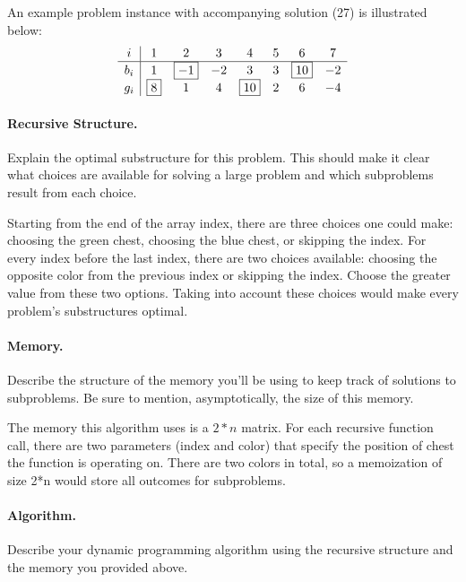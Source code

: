     An example problem instance with accompanying solution (27) is illustrated below:
    \[ 
        \begin{array}{c|ccccccc}
            i   & 1 & 2 & 3 & 4 & 5 & 6 & 7 \\ \hline
            b_i & 1 & \fbox{$-1$} & -2 & 3 & 3 & \fbox{10} & -2 \\
            g_i & \fbox{8} & 1 & 4 & \fbox{10} & 2 & 6 & -4
        \end{array}
    \]


\paragraph{Recursive Structure.}
Explain the optimal substructure for this problem. This should make it clear what choices are available for solving a large problem and which subproblems result from each choice.

Starting from the end of the array index, there are three choices one could make: choosing the green chest, choosing the blue chest, or skipping the index. For every index before the last index, there are two choices available: choosing the opposite color from the previous index or skipping the index. Choose the greater value from these two options. Taking into account these choices would make every problem's substructures optimal. 


\paragraph{Memory.}
Describe the structure of the memory you'll be using to keep track of solutions to subproblems. Be sure to mention, asymptotically, the size of this memory.

The memory this algorithm uses is a $2*n$ matrix. For each recursive function call, there are two parameters (index and color) that specify the position of chest the function is operating on. There are two colors in total, so a memoization of size 2*n would store all outcomes for subproblems.

\paragraph{Algorithm.}
Describe your dynamic programming algorithm using the recursive structure and the memory you provided above.

